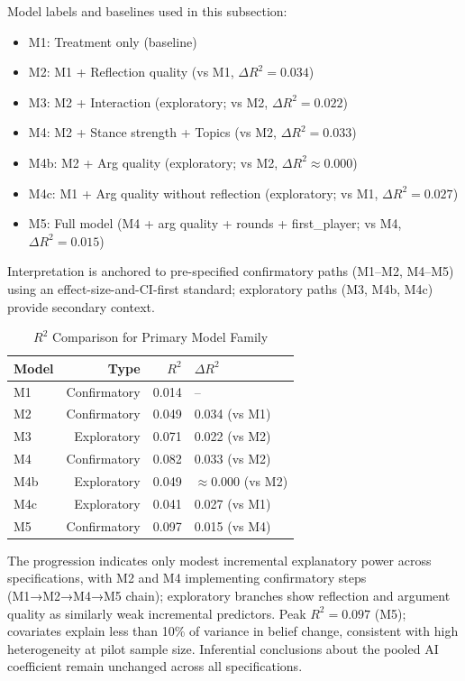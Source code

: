 Model labels and baselines used in this subsection:
\begin{itemize}
    \item M1: Treatment only (baseline)
    \item M2: M1 + Reflection quality (vs M1, $\Delta R^2 = 0.034$)
    \item M3: M2 + Interaction (exploratory; vs M2, $\Delta R^2 = 0.022$)
    \item M4: M2 + Stance strength + Topics (vs M2, $\Delta R^2 = 0.033$)
    \item M4b: M2 + Arg quality (exploratory; vs M2, $\Delta R^2 \approx 0.000$)
    \item M4c: M1 + Arg quality without reflection (exploratory; vs M1, $\Delta R^2 = 0.027$)
    \item M5: Full model (M4 + arg quality + rounds + first\_player; vs M4, $\Delta R^2 = 0.015$)
\end{itemize}

Interpretation is anchored to pre-specified confirmatory paths (M1--M2, M4--M5)
using an effect-size-and-CI-first standard; exploratory paths (M3, M4b, M4c)
provide secondary context.

\begin{table}[h]
\centering
\caption{$R^2$ Comparison for Primary Model Family}
\label{tab:primary_r2_compare}
\begin{tabular}{lrrl}
\toprule
Model & Type & $R^2$ & $\Delta R^2$ \\
\midrule
M1 & Confirmatory & 0.014 & -- \\
M2 & Confirmatory & 0.049 & 0.034 (vs M1) \\
M3 & Exploratory & 0.071 & 0.022 (vs M2) \\
M4 & Confirmatory & 0.082 & 0.033 (vs M2) \\
M4b & Exploratory & 0.049 & $\approx 0.000$ (vs M2) \\
M4c & Exploratory & 0.041 & 0.027 (vs M1) \\
M5 & Confirmatory & 0.097 & 0.015 (vs M4) \\
\bottomrule
\end{tabular}
\end{table}

The progression indicates only modest incremental explanatory power across
specifications, with M2 and M4 implementing confirmatory steps (M1→M2→M4→M5 chain);
exploratory branches show reflection and argument quality as similarly weak incremental predictors.
Peak $R^2=0.097$ (M5); covariates explain less than 10\% of variance in belief change,
consistent with high heterogeneity at pilot sample size. Inferential conclusions about
the pooled AI coefficient remain unchanged across all specifications.

